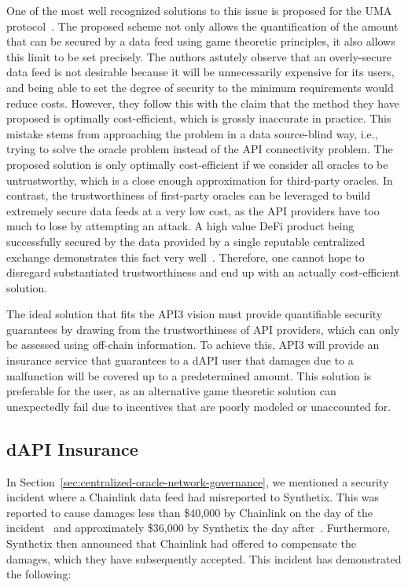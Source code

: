 \documentclass[11pt]{article}
\begin{document}
One of the most well recognized solutions to this issue is proposed for the UMA protocol~\cite{uma:2020}.
The proposed scheme not only allows the quantification of the amount that can be secured by a data feed using game theoretic principles, it also allows this limit to be set precisely.
The authors astutely observe that an overly-secure data feed is not desirable because it will be unnecessarily expensive for its users, and being able to set the degree of security to the minimum requirements would reduce costs.
However, they follow this with the claim that the method they have proposed is optimally cost-efficient, which is grossly inaccurate in practice.
This mistake stems from approaching the problem in a data source-blind way, i.e., trying to solve the oracle problem instead of the API connectivity problem.
The proposed solution is only optimally cost-efficient if we consider all oracles to be untrustworthy, which is a close enough approximation for third-party oracles.
In contrast, the trustworthiness of first-party oracles can be leveraged to build extremely secure data feeds at a very low cost, as the API providers have too much to lose by attempting an attack.
A high value DeFi product being successfully secured by the data provided by a single reputable centralized exchange demonstrates this fact very well~\cite{coinbase}.
Therefore, one cannot hope to disregard substantiated trustworthiness and end up with an actually cost-efficient solution.

The ideal solution that fits the API3 vision must provide quantifiable security guarantees by drawing from the trustworthiness of API providers, which can only be assessed using off-chain information.
To achieve this, API3 will provide an insurance service that guarantees to a dAPI user that damages due to a malfunction will be covered up to a predetermined amount.
This solution is preferable for the user, as an alternative game theoretic solution can unexpectedly fail due to incentives that are poorly modeled or unaccounted for.

\subsection{dAPI Insurance}
\label{sec:dapi-insurance}

In Section~\ref{sec:centralized-oracle-network-governance}, we mentioned a security incident where a Chainlink data feed had misreported to Synthetix.
This was reported to cause damages less than \$40,000 by Chainlink on the day of the incident~\cite{chainlink-fatfinger} and approximately \$36,000 by Synthetix the day after~\cite{synthetix-fatfinger}.
Furthermore, Synthetix then announced that Chainlink had offered to compensate the damages, which they have subsequently accepted.
This incident has demonstrated the following:
\end{document}
